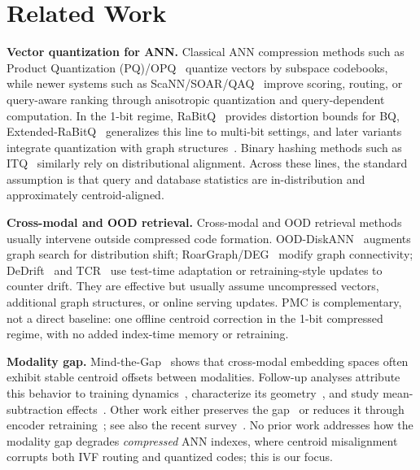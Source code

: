 \section{Related Work}\label{sec:related}

\textbf{Vector quantization for ANN.}
Classical ANN compression methods such as Product Quantization (PQ)\slash OPQ~\cite{jegou2011pq,ge2013opq}
quantize vectors by subspace codebooks, while newer systems such as
ScaNN\slash SOAR\slash QAQ~\cite{guo2020scann,sun2023soar,zhang2023qaq} improve scoring,
routing, or query-aware ranking through anisotropic quantization and
query-dependent computation. In the 1-bit regime,
RaBitQ~\cite{gao2024rabitq} provides distortion bounds for BQ,
Extended-RaBitQ~\cite{gao2025extended} generalizes this line to multi-bit
settings, and later variants integrate quantization with graph
structures~\cite{gou2025symphonyqg}. Binary hashing methods such as
ITQ~\cite{gong2013itq} similarly rely on distributional alignment. Across
these lines, the standard assumption is that query and database statistics are
in-distribution and approximately centroid-aligned.

\textbf{Cross-modal and OOD retrieval.}
Cross-modal and OOD retrieval methods usually intervene outside compressed code formation.
OOD-DiskANN~\cite{jaiswal2022ood,subramanya2019diskann} augments
graph search for distribution shift; RoarGraph/DEG~\cite{chen2024roargraph,yin2025deg}
modify graph connectivity; DeDrift~\cite{baranchuk2023dedrift} and
TCR~\cite{li2025tcr} use test-time adaptation or retraining-style updates to
counter drift. They are effective but usually assume uncompressed vectors, additional graph
structures, or online serving updates. PMC is complementary, not a direct
baseline: one offline centroid correction in the 1-bit compressed regime, with
no added index-time memory or retraining.

\textbf{Modality gap.}
Mind-the-Gap~\cite{liang2022mind} shows that cross-modal embedding spaces often
exhibit stable centroid offsets between modalities. Follow-up analyses attribute
this behavior to training dynamics~\cite{schrodi2025twoeffects}, characterize
its geometry~\cite{levi2025doubleellipsoid}, and study mean-subtraction effects~\cite{zhang2024c3}.
Other work either preserves the gap~\cite{ramasinghe2024acceptgap} or reduces it
through encoder retraining~\cite{eslami2025alignclip}; see also the
recent survey~\cite{wang2024crossmodal}. No prior work addresses how the
modality gap degrades \emph{compressed} ANN indexes, where centroid
misalignment corrupts both IVF routing and quantized codes; this is our focus.

